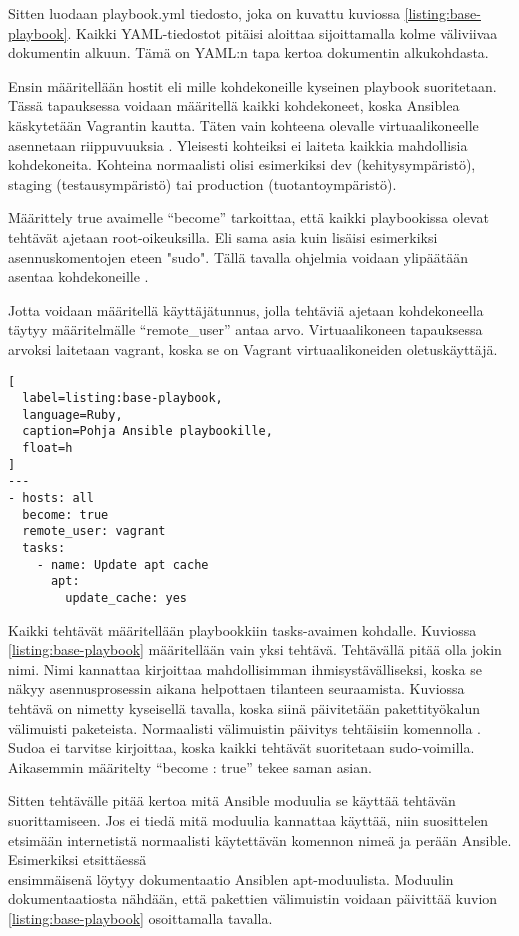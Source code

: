 Sitten luodaan playbook.yml tiedosto, joka on kuvattu kuviossa \ref{listing:base-playbook}. Kaikki YAML-tiedostot pitäisi aloittaa sijoittamalla kolme väliviivaa dokumentin alkuun. Tämä on YAML:n tapa kertoa dokumentin alkukohdasta.

Ensin määritellään hostit eli mille kohdekoneille kyseinen playbook suoritetaan. Tässä tapauksessa voidaan määritellä kaikki kohdekoneet, koska Ansiblea käskytetään Vagrantin kautta. Täten vain kohteena olevalle virtuaalikoneelle asennetaan riippuvuuksia \cite{link:comprehensive-ansible-tutorial}. Yleisesti kohteiksi ei laiteta kaikkia mahdollisia kohdekoneita. Kohteina normaalisti olisi esimerkiksi dev (kehitysympäristö), staging (testausympäristö) tai production (tuotantoympäristö).

Määrittely true avaimelle \enquote{become} tarkoittaa, että kaikki playbookissa olevat tehtävät ajetaan root-oikeuksilla. Eli sama asia kuin lisäisi esimerkiksi asennuskomentojen eteen "sudo". Tällä tavalla ohjelmia voidaan ylipäätään asentaa kohdekoneille \cite{link:ansible-configuration-file}.

Jotta voidaan määritellä käyttäjätunnus, jolla tehtäviä ajetaan kohdekoneella täytyy määritelmälle \enquote{remote\_user} antaa arvo. Virtuaalikoneen tapauksessa arvoksi laitetaan vagrant, koska se on Vagrant virtuaalikoneiden oletuskäyttäjä.

\begin{lstlisting}[
  label=listing:base-playbook,
  language=Ruby,
  caption=Pohja Ansible playbookille,
  float=h
]
---
- hosts: all
  become: true
  remote_user: vagrant
  tasks:
    - name: Update apt cache
      apt:
        update_cache: yes
\end{lstlisting}

Kaikki tehtävät määritellään playbookkiin tasks-avaimen kohdalle. Kuviossa \ref{listing:base-playbook} määritellään vain yksi tehtävä. Tehtävällä pitää olla jokin nimi. Nimi kannattaa kirjoittaa mahdollisimman ihmisystävälliseksi, koska se näkyy asennusprosessin aikana helpottaen tilanteen seuraamista. Kuviossa tehtävä on nimetty kyseisellä tavalla, koska siinä päivitetään pakettityökalun välimuisti paketeista. Normaalisti välimuistin päivitys tehtäisiin komennolla . Sudoa ei tarvitse kirjoittaa, koska kaikki tehtävät suoritetaan sudo-voimilla. Aikasemmin määritelty \enquote{become : true} tekee saman asian.

Sitten tehtävälle pitää kertoa mitä Ansible moduulia se käyttää tehtävän suorittamiseen. Jos ei tiedä mitä moduulia kannattaa käyttää, niin suosittelen etsimään internetistä normaalisti käytettävän komennon nimeä ja perään Ansible. Esimerkiksi etsittäessä \\  ensimmäisenä löytyy dokumentaatio Ansiblen apt-moduulista. Moduulin dokumentaatiosta nähdään, että pakettien välimuistin voidaan päivittää kuvion \ref{listing:base-playbook} osoittamalla tavalla.

